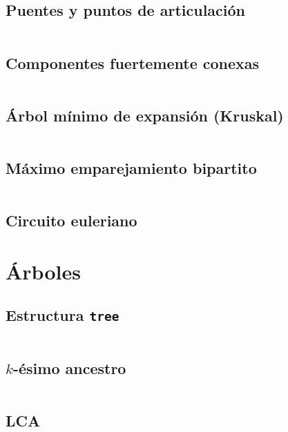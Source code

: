 \documentclass[11pt]{article}
\begin{document}
		\subsection{Puentes y puntos de articulación}
		\inputminted[tabsize=2,breaklines,firstline=276,lastline=304,fontsize=\small]{c++}{graph.cpp}
		
		\subsection{Componentes fuertemente conexas}
		\inputminted[tabsize=2,breaklines,firstline=306,lastline=335,fontsize=\small]{c++}{graph.cpp}
		
		\subsection{Árbol mínimo de expansión (Kruskal)}
		\inputminted[tabsize=2,breaklines,firstline=337,lastline=353,fontsize=\small]{c++}{graph.cpp}
		
		\subsection{Máximo emparejamiento bipartito}
		\inputminted[tabsize=2,breaklines,firstline=355,lastline=409,fontsize=\small]{c++}{graph.cpp}
		
		\subsection{Circuito euleriano}
		
		
	\newpage
	\section{Árboles}		
		\subsection{Estructura \texttt{tree}}
		\inputminted[tabsize=2,breaklines,firstline=432,lastline=470,fontsize=\small]{c++}{graph.cpp}
		
		\subsection{$k$-ésimo ancestro}
		\inputminted[tabsize=2,breaklines,firstline=472,lastline=484,fontsize=\small]{c++}{graph.cpp}
		
		\subsection{LCA}
		\inputminted[tabsize=2,breaklines,firstline=486,lastline=505,fontsize=\small]{c++}{graph.cpp}
		
\end{document}
